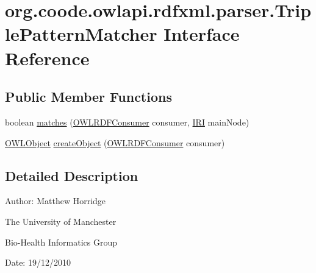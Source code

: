 \hypertarget{interfaceorg_1_1coode_1_1owlapi_1_1rdfxml_1_1parser_1_1_triple_pattern_matcher}{\section{org.\-coode.\-owlapi.\-rdfxml.\-parser.\-Triple\-Pattern\-Matcher Interface Reference}
\label{interfaceorg_1_1coode_1_1owlapi_1_1rdfxml_1_1parser_1_1_triple_pattern_matcher}
}
\subsection*{Public Member Functions}
\begin{DoxyCompactItemize}
\item 
boolean \hyperlink{interfaceorg_1_1coode_1_1owlapi_1_1rdfxml_1_1parser_1_1_triple_pattern_matcher_a027989db9354c358a95429ba2205773a}{matches} (\hyperlink{classorg_1_1coode_1_1owlapi_1_1rdfxml_1_1parser_1_1_o_w_l_r_d_f_consumer}{O\-W\-L\-R\-D\-F\-Consumer} consumer, \hyperlink{classorg_1_1semanticweb_1_1owlapi_1_1model_1_1_i_r_i}{I\-R\-I} main\-Node)
\item 
\hyperlink{interfaceorg_1_1semanticweb_1_1owlapi_1_1model_1_1_o_w_l_object}{O\-W\-L\-Object} \hyperlink{interfaceorg_1_1coode_1_1owlapi_1_1rdfxml_1_1parser_1_1_triple_pattern_matcher_a8148fb7b3a41d2d98585b6d5f04b3ff5}{create\-Object} (\hyperlink{classorg_1_1coode_1_1owlapi_1_1rdfxml_1_1parser_1_1_o_w_l_r_d_f_consumer}{O\-W\-L\-R\-D\-F\-Consumer} consumer)
\end{DoxyCompactItemize}


\subsection{Detailed Description}
Author\-: Matthew Horridge\par
 The University of Manchester\par
 Bio-\/\-Health Informatics Group\par
 Date\-: 19/12/2010 

